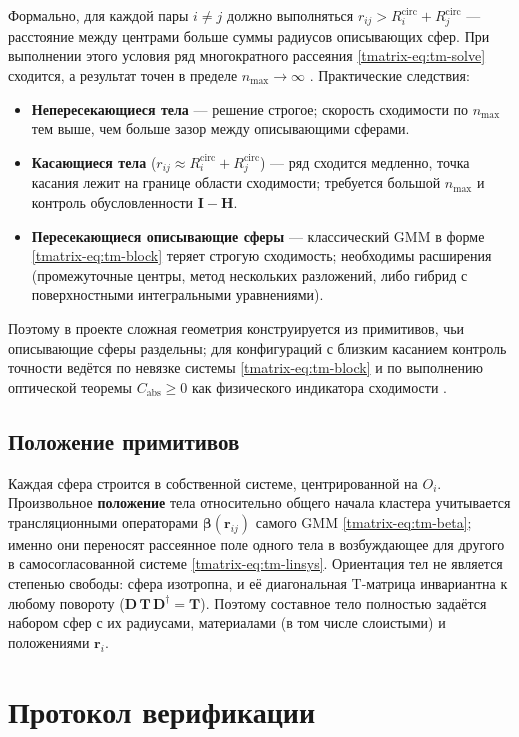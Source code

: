 \documentclass[11pt,a4paper]{article}
\begin{document}
Формально, для каждой пары $i\ne j$ должно выполняться $r_{ij} > R_i^{\mathrm{circ}} + R_j^{\mathrm{circ}}$ --- расстояние между центрами больше суммы радиусов описывающих сфер. При выполнении этого условия ряд многократного рассеяния \eqref{tmatrix-eq:tm-solve} сходится, а результат точен в пределе $n_{\max}\to\infty$ \cite{mishchenko2002}. Практические следствия:
\begin{itemize}
\item \textbf{Непересекающиеся тела} --- решение строгое; скорость сходимости по $n_{\max}$ тем выше, чем больше зазор между описывающими сферами.
\item \textbf{Касающиеся тела} ($r_{ij}\approx R_i^{\mathrm{circ}}+R_j^{\mathrm{circ}}$) --- ряд сходится медленно, точка касания лежит на границе области сходимости; требуется большой $n_{\max}$ и контроль обусловленности $\mathbf{I}-\mathbf{H}$.
\item \textbf{Пересекающиеся описывающие сферы} --- классический GMM в форме \eqref{tmatrix-eq:tm-block} теряет строгую сходимость; необходимы расширения (промежуточные центры, метод нескольких разложений, либо гибрид с поверхностными интегральными уравнениями).
\end{itemize}
Поэтому в проекте сложная геометрия конструируется из примитивов, чьи описывающие сферы раздельны; для конфигураций с близким касанием контроль точности ведётся по невязке системы \eqref{tmatrix-eq:tm-block} и по выполнению оптической теоремы $C_{\mathrm{abs}}\ge 0$ как физического индикатора сходимости \cite{mishchenko2002}.

\subsection{Положение примитивов}
\label{tmatrix-sec:tm-place}
Каждая сфера строится в собственной системе, центрированной на $O_i$. Произвольное
\textbf{положение} тела относительно общего начала кластера учитывается трансляционными
операторами $\bm\beta(\bm r_{ij})$ самого GMM \eqref{tmatrix-eq:tm-beta}; именно они
переносят рассеянное поле одного тела в возбуждающее для другого в самосогласованной
системе \eqref{tmatrix-eq:tm-linsys}. Ориентация тел не является степенью свободы:
сфера изотропна, и её диагональная T-матрица инвариантна к любому повороту
($\bm D\,\bm T\,\bm D^{\dagger}=\bm T$). Поэтому составное тело полностью задаётся набором
сфер с их радиусами, материалами (в том числе слоистыми) и положениями $\bm r_i$.

\section{Протокол верификации}
\label{decomp-sec:decomp}
\end{document}

